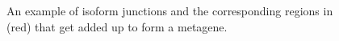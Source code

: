 \begin{figure}
    \begin{center}
        
    \end{center}
    \caption{An example of isoform junctions and the corresponding regions in (red) that get added up to form a metagene.}
    \label{metagene}
\end{figure}